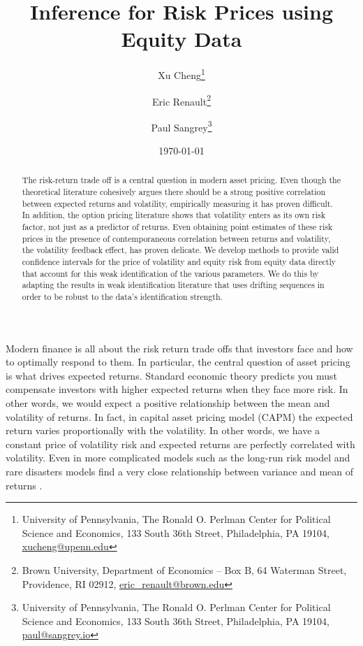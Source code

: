 \documentclass[11pt, letterpaper, twoside, final]{article}
\author{Xu Cheng\thanks{University of Pennsylvania, The Ronald O. Perlman Center for Political Science and
    Economics, 133 South 36th Street, Philadelphia, PA 19104, \href{mailto:xucheng@upenn.edu}{xucheng@upenn.edu}}
    \and 
    Eric Renault\thanks{Brown University, Department of Economics -- Box B, 64 Waterman Street, Providence, RI
    02912, \href{mailto:eric_renault@brown.edu}{eric\_renault@brown.edu}}
    \and 
    Paul Sangrey\thanks{University of Pennsylvania, The Ronald O. Perlman Center for Political Science and
    Economics, 133 South 36th Street, Philadelphia, PA 19104, \href{mailto:paul@sangrey.io}{paul@sangrey.io}}}
\title{Inference for Risk Prices using Equity Data}
\date{\today}
\begin{document}
\begin{titlepage}


    \maketitle
    \thispagestyle{empty}
    \addtocounter{page}{-1}

    \begin{abstract} \singlespacing \noindent 
        The risk-return trade off is a central question in modern asset pricing. 
        Even though the theoretical literature cohesively argues there should be a strong positive correlation
        between expected returns and volatility, empirically measuring it has proven difficult. 
        In addition, the option pricing literature shows that volatility enters as its own risk factor, not just
        as a predictor of returns.
        Even obtaining point estimates of these risk prices in the presence of contemporaneous correlation between
        returns and volatility, the  volatility feedback effect, has proven delicate.
        We develop methods to provide  valid confidence intervals for the price of volatility and equity risk from
        equity data directly that account for this weak identification of the various parameters. 
        We do this by adapting the results in weak identification literature that uses drifting sequences in order
        to be robust to the data's identification strength. 
    \end{abstract}



\end{titlepage}

{}

Modern finance is all about the risk return trade offs that investors face and how to optimally respond to them. 
In particular, the central question of asset pricing is what drives expected returns.
Standard economic theory predicts you must compensate investors with higher expected returns when they face more
risk.
In other words, we would expect a positive relationship between the mean and volatility of returns.
In fact, in  capital asset pricing model (CAPM) the expected
return varies proportionally with the volatility. 
In other words, we have a constant price of volatility risk and expected returns are perfectly correlated with
volatility.
Even in more complicated models such as the long-run risk model and rare disasters models find a very close
relationship between variance and mean of returns \parencite{bansal2014volatility, wachter2013can}.
\end{document}
